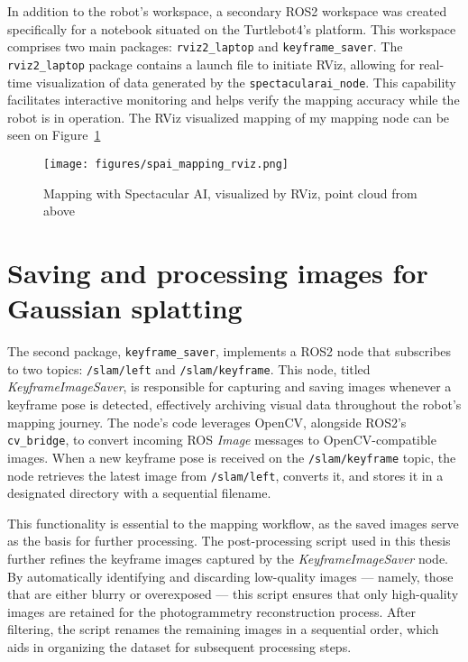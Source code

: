 In addition to the robot’s workspace, a secondary ROS2 workspace was created specifically for a notebook situated on the Turtlebot4’s platform. This workspace comprises two main packages: \verb|rviz2_laptop| and \verb|keyframe_saver|. The \verb|rviz2_laptop| package contains a launch file to initiate RViz, allowing for real-time visualization of data generated by the \verb|spectacularai_node|. This capability facilitates interactive monitoring and helps verify the mapping accuracy while the robot is in operation. The RViz visualized mapping of my mapping node can be seen on Figure~\ref{fig:spai_mapping_rviz}

\begin{figure}[htbp]
	\centering
	\texttt{[image: figures/spai\_mapping\_rviz.png]}
	\caption{Mapping with Spectacular AI, visualized by RViz, point cloud from above}
	\label{fig:spai_mapping_rviz}
\end{figure}


\section{Saving and processing images for Gaussian splatting}

The second package, \verb|keyframe_saver|, implements a ROS2 node that subscribes to two topics: \verb|/slam/left| and \verb|/slam/keyframe|. This node, titled \textit{KeyframeImageSaver}, is responsible for capturing and saving images whenever a keyframe pose is detected, effectively archiving visual data throughout the robot’s mapping journey. The node’s code leverages OpenCV, alongside ROS2's \verb|cv_bridge|, to convert incoming ROS \textit{Image} messages to OpenCV-compatible images. When a new keyframe pose is received on the \verb|/slam/keyframe| topic, the node retrieves the latest image from \verb|/slam/left|, converts it, and stores it in a designated directory with a sequential filename.

This functionality is essential to the mapping workflow, as the saved images serve as the basis for further processing. The post-processing script used in this thesis further refines the keyframe images captured by the \textit{KeyframeImageSaver} node. By automatically identifying and discarding low-quality images — namely, those that are either blurry or overexposed — this script ensures that only high-quality images are retained for the photogrammetry reconstruction process. After filtering, the script renames the remaining images in a sequential order, which aids in organizing the dataset for subsequent processing steps.


